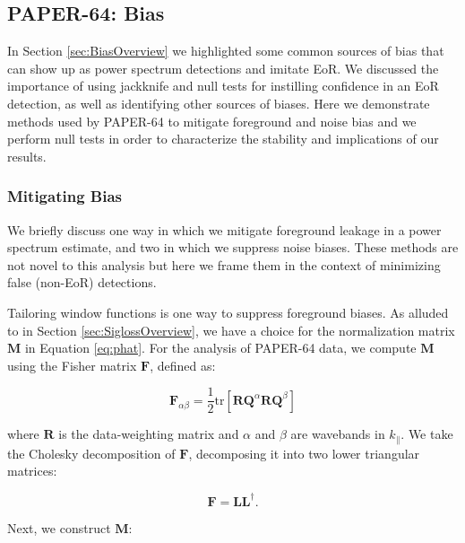 \documentclass[preprint2,numberedappendix,tighten]{aastex6}  %
\begin{document}

\subsection{PAPER-64: Bias}
\label{sec:Bias}

In Section \ref{sec:BiasOverview} we highlighted some common sources of bias that can show up as power spectrum 
detections and imitate EoR. We discussed the importance of using jackknife and null tests for instilling confidence in an EoR 
detection, as well as identifying other sources of biases. Here we demonstrate methods used by PAPER-64 to mitigate 
foreground and noise bias and we perform null tests in order to characterize the stability and implications of our results.

\subsubsection{Mitigating Bias}

We briefly discuss one way in which we mitigate foreground leakage in a power spectrum estimate, and two in which we 
suppress noise biases. These methods are not novel to this analysis but here we frame them in the context of minimizing false 
(non-EoR) detections.

Tailoring window functions is one way to suppress foreground biases. As alluded to in Section \ref{sec:SiglossOverview}, we 
have a choice for the normalization matrix $\textbf{M}$ in Equation \eqref{eq:phat}. For the analysis of PAPER-64 data, we 
compute $\textbf{M}$ using the Fisher matrix $\textbf{F}$, defined as:

\begin{equation}
\textbf{F}_{\alpha\beta} = \frac{1}{2} \text{tr} [\textbf{R}\textbf{Q}^{\alpha}\textbf{R}\textbf{Q}^{\beta} ]
\end{equation}

\noindent where $\textbf{R}$ is the data-weighting matrix and $\alpha$ and $\beta$ are wavebands in $k_{\parallel}$. We take 
the Cholesky decomposition of $\textbf{F}$, decomposing it into two lower triangular matrices:

\begin{equation}
\textbf{F} = \textbf{LL}^{\dagger}.
\end{equation}

\noindent Next, we construct $\textbf{M}$:
\end{document}
